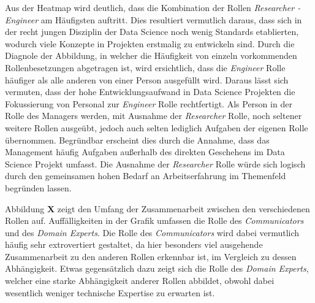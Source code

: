 Aus der Heatmap wird deutlich, dass die Kombination der Rollen \textit{Researcher - Engineer} am Häufigsten auftritt.
Dies resultiert vermutlich daraus, dass sich in der recht jungen Disziplin der Data Science noch wenig Standards etablierten, wodurch viele Konzepte in Projekten erstmalig zu entwickeln sind.
Durch die Diagnole der Abbildung, in welcher die Häufigkeit von einzeln vorkommenden Rollenbesetzungen abgetragen ist, wird ersichtlich, dass die \textit{Engineer} Rolle häufiger als alle anderen von einer Person ausgefüllt wird.
Daraus lässt sich vermuten, dass der hohe Entwicklungsaufwand in Data Science Projekten die Fokussierung von Personal zur \textit{Engineer} Rolle rechtfertigt.
Als Person in der Rolle des Managers werden, mit Ausnahme der \textit{Researcher} Rolle, noch seltener weitere Rollen ausgeübt, jedoch auch selten lediglich Aufgaben der eigenen Rolle übernommen.
Begründbar erscheint dies durch die Annahme, dass das Management häufig Aufgaben außerhalb des direkten Geschehens im Data Science Projekt umfasst.
Die Ausnahme der \textit{Researcher} Rolle würde sich logisch durch den gemeinsamen hohen Bedarf an Arbeitserfahrung im Themenfeld begründen lassen.

Abbildung \textbf{X} zeigt den Umfang der Zusammenarbeit zwischen den verschiedenen Rollen auf.
Auffälligkeiten in der Grafik umfassen die Rolle des \textit{Communicators} und des \textit{Domain Experts}.
Die Rolle des \textit{Communicators} wird dabei vermutlich häufig sehr extrovertiert gestaltet, da hier besonders viel ausgehende Zusammenarbeit zu den anderen Rollen erkennbar ist, im Vergleich zu dessen Abhängigkeit.
Etwas gegensätzlich dazu zeigt sich die Rolle des \textit{Domain Experts}, welcher eine starke Abhängigkeit anderer Rollen abbildet, obwohl dabei wesentlich weniger technische Expertise zu erwarten ist.

